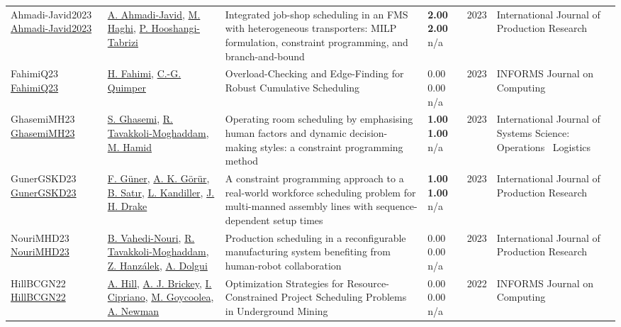 {\begin{longtable}{p{3cm}p{5cm}p{10cm}p{1cm}rp{2.5cm}l}
Ahmadi-Javid2023 \href{http://dx.doi.org/10.1080/00207543.2023.2230489}{Ahmadi-Javid2023} & \hyperref[auth:a1759]{A. Ahmadi-Javid}, \hyperref[auth:a1760]{M. Haghi}, \hyperref[auth:a1761]{P. Hooshangi-Tabrizi} & Integrated job-shop scheduling in an FMS with heterogeneous transporters: MILP formulation, constraint programming, and branch-and-bound & \noindent{}\textbf{2.00} \textbf{2.00} n/a & 2023 & \cellcolor{red!20}International Journal of Production Research & \cite{Ahmadi-Javid2023}\\
FahimiQ23 \href{http://dx.doi.org/10.1287/ijoc.2021.0138}{FahimiQ23} & \hyperref[auth:a122]{H. Fahimi}, \hyperref[auth:a37]{C.-G. Quimper} & Overload-Checking and Edge-Finding for Robust Cumulative Scheduling & \noindent{}\textcolor{black!50}{0.00} \textcolor{black!50}{0.00} n/a & 2023 & \cellcolor{red!20}INFORMS Journal on Computing & \cite{FahimiQ23}\\
GhasemiMH23 \href{http://dx.doi.org/10.1080/23302674.2023.2224509}{GhasemiMH23} & \hyperref[auth:a980]{S. Ghasemi}, \hyperref[auth:a429]{R. Tavakkoli-Moghaddam}, \hyperref[auth:a981]{M. Hamid} & Operating room scheduling by emphasising human factors and dynamic decision-making styles: a constraint programming method & \noindent{}\textbf{1.00} \textbf{1.00} n/a & 2023 & \cellcolor{red!20}International Journal of Systems Science: Operations \  Logistics & \cite{GhasemiMH23}\\
GunerGSKD23 \href{http://dx.doi.org/10.1080/00207543.2023.2226772}{GunerGSKD23} & \hyperref[auth:a1425]{F. G\"{u}ner}, \hyperref[auth:a1426]{A. K. G\"{o}r\"{u}r}, \hyperref[auth:a1427]{B. Satır}, \hyperref[auth:a1428]{L. Kandiller}, \hyperref[auth:a1429]{J. H. Drake} & A constraint programming approach to a real-world workforce scheduling problem for multi-manned assembly lines with sequence-dependent setup times & \noindent{}\textbf{1.00} \textbf{1.00} n/a & 2023 & \cellcolor{red!20}International Journal of Production Research & \cite{GunerGSKD23}\\
NouriMHD23 \href{http://dx.doi.org/10.1080/00207543.2023.2173503}{NouriMHD23} & \hyperref[auth:a736]{B. Vahedi-Nouri}, \hyperref[auth:a429]{R. Tavakkoli-Moghaddam}, \hyperref[auth:a945]{Z. Hanzálek}, \hyperref[auth:a946]{A. Dolgui} & Production scheduling in a reconfigurable manufacturing system benefiting from human-robot collaboration & \noindent{}\textcolor{black!50}{0.00} \textcolor{black!50}{0.00} n/a & 2023 & \cellcolor{red!20}International Journal of Production Research & \cite{NouriMHD23}\\
HillBCGN22 \href{http://dx.doi.org/10.1287/ijoc.2022.1222}{HillBCGN22} & \hyperref[auth:a64]{A. Hill}, \hyperref[auth:a970]{A. J. Brickey}, \hyperref[auth:a971]{I. Cipriano}, \hyperref[auth:a972]{M. Goycoolea}, \hyperref[auth:a973]{A. Newman} & Optimization Strategies for Resource-Constrained Project Scheduling Problems in Underground Mining & \noindent{}\textcolor{black!50}{0.00} \textcolor{black!50}{0.00} n/a & 2022 & \cellcolor{red!20}INFORMS Journal on Computing & \cite{HillBCGN22}\\

\end{longtable}}
